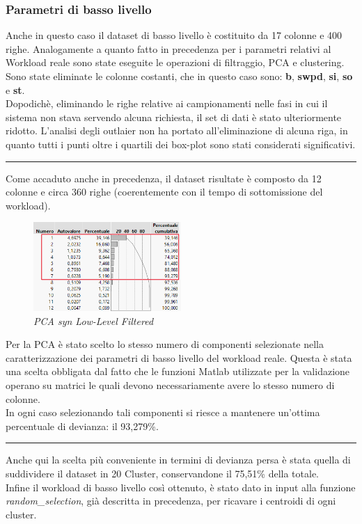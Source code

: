 \subsubsection{Parametri di basso livello}
Anche in questo caso il dataset di basso livello è costituito da 17 colonne e 400 righe. Analogamente a quanto fatto in precedenza per i parametri relativi al Workload reale sono state eseguite le operazioni di filtraggio, PCA e clustering.
\\
Sono state eliminate le colonne costanti, che in questo caso sono: \textbf{b}, \textbf{swpd}, \textbf{si}, \textbf{so} e \textbf{st}.
\\
Dopodichè, eliminando le righe relative ai campionamenti nelle fasi in cui il sistema non stava servendo alcuna richiesta, il set di dati è stato ulteriormente ridotto. L'analisi degli outlaier non ha portato all'eliminazione di alcuna riga, in quanto tutti i punti oltre i quartili dei box-plot sono stati considerati significativi. 
\\
\hrule
\vspace{0.3cm}
Come accaduto anche in precedenza, il dataset risultate è composto da 12 colonne e circa 360 righe (coerentemente con il tempo di sottomissione del workload).
\\
\begin{figure}[H]
	\centering
	\includegraphics[width=0.5\textwidth]{img/hw3/PCA7_syn.png}
	\caption{\textit{PCA syn Low-Level Filtered}}
\end{figure}
Per la PCA è stato scelto lo stesso numero di componenti selezionate nella caratterizzazione dei parametri di basso livello del workload reale.
Questa è stata una scelta obbligata dal fatto che le funzioni Matlab utilizzate per la validazione operano su matrici le quali devono necessariamente avere lo stesso numero di colonne.
\\
In ogni caso selezionando tali componenti si riesce a mantenere un'ottima percentuale di devianza: il 93,279\%.
\\
\hrule
\vspace{0.3cm}
Anche qui la scelta più conveniente in termini di devianza persa è stata quella di suddividere il dataset in 20 Cluster, conservandone il 75,51\% della totale. 
\\
Infine il workload di basso livello così ottenuto, è stato dato in input alla funzione \textit{random\_selection}, già descritta in precedenza, per ricavare i centroidi di ogni cluster.
